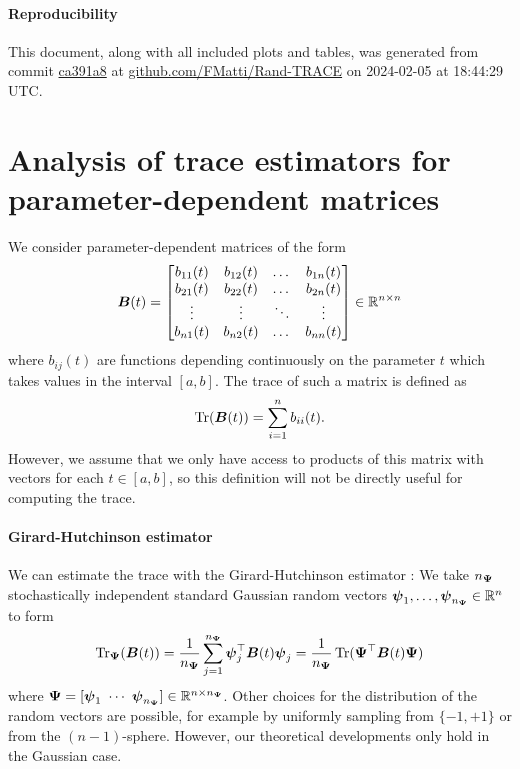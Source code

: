 \documentclass[12pt]{article}
\begin{document}
\paragraph{Reproducibility} This document, along with all included plots and tables, was generated from commit \href{https://github.com/FMatti/Rand-SD/tree/ca391a8}{ca391a8} at \href{https://github.com/FMatti/Rand-TRACE}{github.com/FMatti/Rand-TRACE} on 2024-02-05 at 18:44:29 UTC.

\section{Analysis of trace estimators for parameter-dependent matrices}
\label{sec:analysis}

We consider parameter-dependent matrices of the form
\begin{equation}
    \boldsymbol{B}(t) = \begin{bmatrix}
        b_{11}(t) & b_{12}(t) & \dots & b_{1n}(t) \\
        b_{21}(t) & b_{22}(t) & \dots & b_{2n}(t) \\
        \vdots & \vdots & \ddots & \vdots \\
        b_{n1}(t) & b_{n2}(t) & \dots & b_{nn}(t) \\
    \end{bmatrix} \in \mathbb{R}^{n \times n}
\end{equation}
where $b_{ij}(t)$ are functions depending continuously on the parameter $t$ which takes values in the interval $[a,b]$. The trace of such a matrix is defined as
\begin{equation}
    \operatorname{Tr}(\boldsymbol{B}(t)) = \sum_{i=1}^{n} b_{ii}(t).
    \label{equ:definition-trace}
\end{equation}
However, we assume that we only have access to products of this matrix with vectors for each $t \in [a, b]$, so this definition will not be directly useful for computing the trace.

\paragraph{Girard-Hutchinson estimator} We can estimate the trace with the Girard-Hutchinson estimator \cite{girard-1989-fast-montecarlo,hutchinson-1990-stochastic-estimator}: We take $n_{\boldsymbol{\Psi}}$ stochastically independent standard Gaussian random vectors $\boldsymbol{\psi}_1,\dots, \boldsymbol{\psi}_{n_{\boldsymbol{\Psi}}} \in \mathbb{R}^{n}$ to form
\begin{equation}
    \operatorname{Tr}_{\boldsymbol{\Psi}}(\boldsymbol{B}(t))
    = \frac{1}{n_{\boldsymbol{\Psi}}} \sum_{j=1}^{n_{\boldsymbol{\Psi}}} \boldsymbol{\psi}_j^{\top} \boldsymbol{B}(t) \boldsymbol{\psi}_j
    = \frac{1}{n_{\boldsymbol{\Psi}}} \operatorname{Tr}( \boldsymbol{\Psi}^{\top} \boldsymbol{B}(t) \boldsymbol{\Psi})
    \label{equ:hutchinson-trace-estimator}
\end{equation}
where $\boldsymbol{\Psi} = [\boldsymbol{\psi}_1 ~ \cdots ~ \boldsymbol{\psi}_{n_{\boldsymbol{\Psi}}}] \in \mathbb{R}^{n \times n_{\boldsymbol{\Psi}}}$. Other choices for the distribution of the random vectors are possible, for example by uniformly sampling from $\{-1, +1\}$ or from the $(n-1)$-sphere. However, our theoretical developments only hold in the Gaussian case.
\end{document}
